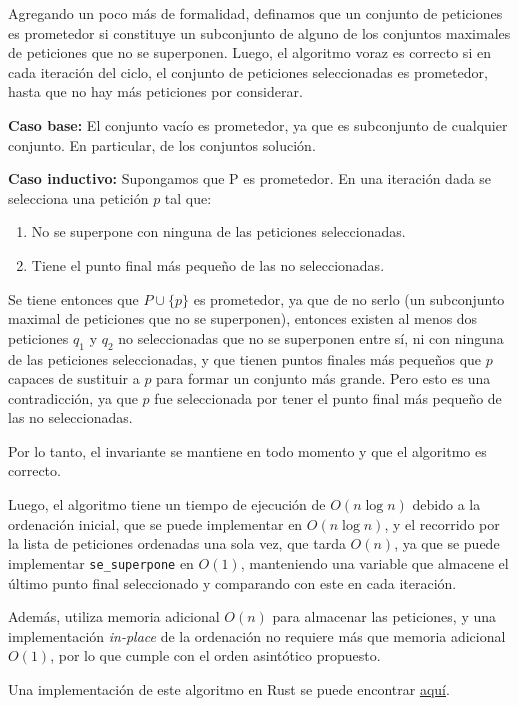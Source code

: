 \documentclass[letterpaper, 12pt]{article}
\begin{document}
\begin{enumerate}
Agregando un poco más de formalidad, definamos que un conjunto de peticiones es prometedor si constituye un subconjunto de alguno de los conjuntos maximales de peticiones que no se superponen. Luego, el algoritmo voraz es correcto si en cada iteración del ciclo, el conjunto de peticiones seleccionadas es prometedor, hasta que no hay más peticiones por considerar.

\textbf{Caso base:} El conjunto vacío es prometedor, ya que es subconjunto de cualquier conjunto. En particular, de los conjuntos solución.

\textbf{Caso inductivo:} Supongamos que P es prometedor. En una iteración dada se selecciona una petición $p$ tal que:

\begin{enumerate}
    \item No se superpone con ninguna de las peticiones seleccionadas.
    \item Tiene el punto final más pequeño de las no seleccionadas.
\end{enumerate}

Se tiene entonces que $P \cup \{p\}$ es prometedor, ya que de no serlo (un subconjunto maximal de peticiones que no se superponen), entonces existen al menos dos peticiones $q_1$ y $q_2$ no seleccionadas que no se superponen entre sí, ni con ninguna de las peticiones seleccionadas, y que tienen puntos finales más pequeños que $p$ capaces de sustituir a $p$ para formar un conjunto más grande. Pero esto es una contradicción, ya que $p$ fue seleccionada por tener el punto final más pequeño de las no seleccionadas.

Por lo tanto, el invariante se mantiene en todo momento y que el algoritmo es correcto.

Luego, el algoritmo tiene un tiempo de ejecución de $O(n \log n)$ debido a la ordenación inicial, que se puede implementar en $O(n \log n)$, y el recorrido por la lista de peticiones ordenadas una sola vez, que tarda $O(n)$, ya que se puede implementar \texttt{se\_superpone} en $O(1)$, manteniendo una variable que almacene el último punto final seleccionado y comparando con este en cada iteración.

Además, utiliza memoria adicional $O(n)$ para almacenar las peticiones, y una implementación \emph{in-place} de la ordenación no requiere más que memoria adicional $O(1)$, por lo que cumple con el orden asintótico propuesto.

Una implementación de este algoritmo en Rust se puede encontrar \href{https://gitfront.io/r/chrischriscris/swaWSXShzVoW/Tareas-CI5651-EM2024/tree/tarea2/ej1/}{aquí}. \\


\end{enumerate}
\end{document}
